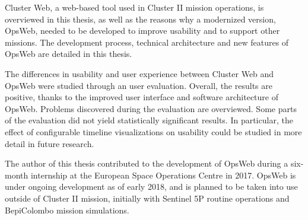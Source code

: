 
Cluster Web, a web-based tool used in Cluster II mission operations, is overviewed in this thesis, as well as the reasons why a modernized version, OpsWeb, needed to be developed to improve usability and to support other missions. The development process, technical architecture and new features of OpsWeb are detailed in this thesis. 

The differences in usability and user experience between Cluster Web and OpsWeb were studied through an user evaluation. Overall, the results are positive, thanks to the improved user interface and software architecture of OpsWeb. Problems discovered during the evaluation are overviewed. Some parts of the evaluation did not yield statistically significant results. In particular, the effect of configurable timeline visualizations on usability could be studied in more detail in future research.

The author of this thesis contributed to the development of OpsWeb during a six-month internship at the European Space Operations Centre in 2017. OpsWeb is under ongoing development as of early 2018, and is planned to be taken into use outside of Cluster II mission, initially with Sentinel 5P routine operations and BepiColombo mission simulations.